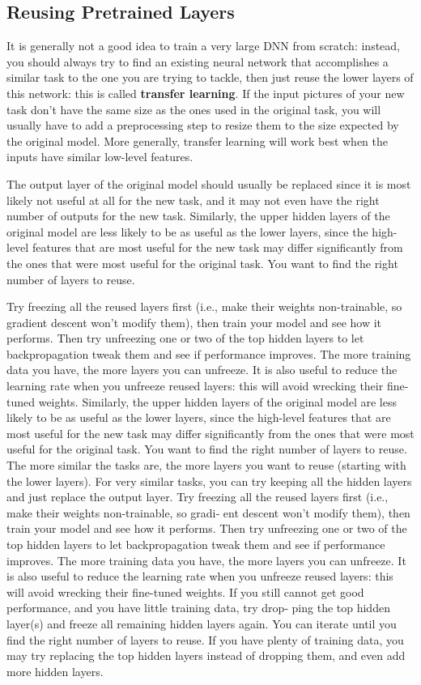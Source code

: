 \documentclass[12pt, letterpaper]{article}
\theoremstyle{definition}
\let\tb\textbf
\begin{document}
\subsection{Reusing Pretrained Layers}
It is generally not a good idea to train a very large DNN from scratch: instead, you should always try to find an existing neural network that accomplishes a similar task to the one you are trying to tackle, then just reuse the lower layers of this network: this is called \tb{transfer learning}. If the input pictures of your new task don't have the same size as the ones used in the original task, you will usually have to add a preprocessing step to resize them to the size expected by the original model. More generally, transfer learning will work best when the inputs have similar low-level features.

The output layer of the original model should usually be replaced since it is most likely not useful at all for the new task, and it may not even have the right number of outputs for the new task. Similarly, the upper hidden layers of the original model are less likely to be as useful as the lower layers, since the high-level features that are most useful for the new task may differ significantly from the ones that were most useful for the original task. You want to find the right number of layers to reuse.

Try freezing all the reused layers first (i.e., make their weights non-trainable, so gradient descent won't modify them), then train your model and see how it performs. Then try unfreezing one or two of the top hidden layers to let backpropagation tweak them and see if performance improves. The more training data you have, the more layers you can unfreeze. It is also useful to reduce the learning rate when you unfreeze reused layers: this will avoid wrecking their fine-tuned weights. 
Similarly, the upper hidden layers of the original model are less likely to be as useful as the lower layers, since the high-level features that are most useful for the new task may differ significantly from the ones that were most useful for the original task. You want to find the right number of layers to reuse.
The more similar the tasks are, the more layers you want to reuse (starting with the lower layers). For very similar tasks, you can try keeping all the hidden layers and just replace the output layer.
Try freezing all the reused layers first (i.e., make their weights non-trainable, so gradi‐ ent descent won’t modify them), then train your model and see how it performs. Then try unfreezing one or two of the top hidden layers to let backpropagation tweak them and see if performance improves. The more training data you have, the more layers you can unfreeze. It is also useful to reduce the learning rate when you unfreeze reused layers: this will avoid wrecking their fine-tuned weights.
If you still cannot get good performance, and you have little training data, try drop‐ ping the top hidden layer(s) and freeze all remaining hidden layers again. You can iterate until you find the right number of layers to reuse. If you have plenty of training data, you may try replacing the top hidden layers instead of dropping them, and even add more hidden layers.
\end{document}
